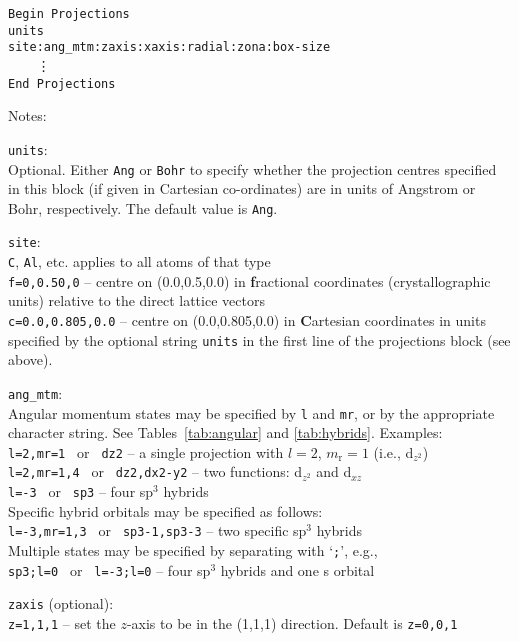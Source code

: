 \noindent
\verb#Begin Projections#\\
\verb#units#\\ 
\verb#site:ang_mtm:zaxis:xaxis:radial:zona:box-size#\\
\verb#    #\vdots\\
\verb#End Projections#

\noindent
Notes:

\noindent
\verb#units#:\\
Optional. Either \verb#Ang# or \verb#Bohr# to specify whether the
projection centres 
specified in this block (if given in Cartesian co-ordinates) are in
units of Angstrom or Bohr, respectively. The default value is \verb#Ang#.

\noindent
\verb#site#:\\
\verb#C#, \verb#Al#, etc. applies to all atoms of that type\\
\verb#f=0,0.50,0# -- centre on (0.0,0.5,0.0) in \textbf{f}ractional coordinates
(crystallographic units) relative to the direct lattice vectors \\
\verb#c=0.0,0.805,0.0# -- centre on (0.0,0.805,0.0) in \textbf{C}artesian
coordinates in units specified by the optional string \verb#units# in
the first line of the projections block (see above).

\noindent
\verb#ang_mtm#:\\
 Angular momentum states may be specified by \verb#l# and \verb#mr#,
 or by the appropriate character string. See Tables~\ref{tab:angular}
 and \ref{tab:hybrids}. Examples:\\
 \verb#l=2,mr=1 # or \verb# dz2# -- a single projection with $l=2$,
 $m_{\textrm{r}}=1$ (i.e., d$_{z^{2}}$)\\
 \verb#l=2,mr=1,4 # or \verb# dz2,dx2-y2# -- two functions: d$_{z^{2}}$ and d$_{xz}$\\
 \verb#l=-3 # or \verb# sp3# -- four sp$^{3}$ hybrids\\
 Specific hybrid orbitals may be specified as follows:\\
 \verb#l=-3,mr=1,3 # or \verb# sp3-1,sp3-3# -- two specific sp$^{3}$ hybrids\\
 Multiple states may be specified by separating with 
 `\verb#;#', e.g.,\\
 \verb#sp3;l=0 # or \verb# l=-3;l=0# -- four sp$^{3}$ hybrids and one s orbital

\noindent
\verb#zaxis# (optional):\\
\verb#z=1,1,1#  --  set the $z$-axis to be in the (1,1,1) direction. Default
is \verb#z=0,0,1# 

